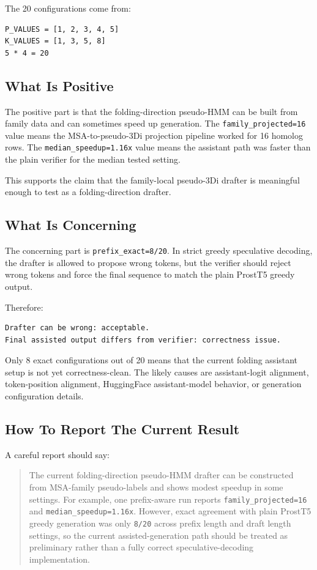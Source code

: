 \documentclass[11pt,a4paper]{article}
\begin{document}
The 20 configurations come from:

\begin{verbatim}
P_VALUES = [1, 2, 3, 4, 5]
K_VALUES = [1, 3, 5, 8]
5 * 4 = 20
\end{verbatim}

\subsection{What Is Positive}

The positive part is that the folding-direction pseudo-HMM can be built from family data and can sometimes speed up generation. The \texttt{family\_projected=16} value means the MSA-to-pseudo-3Di projection pipeline worked for 16 homolog rows. The \texttt{median\_speedup=1.16x} value means the assistant path was faster than the plain verifier for the median tested setting.

This supports the claim that the family-local pseudo-3Di drafter is meaningful enough to test as a folding-direction drafter.

\subsection{What Is Concerning}

The concerning part is \texttt{prefix\_exact=8/20}. In strict greedy speculative decoding, the drafter is allowed to propose wrong tokens, but the verifier should reject wrong tokens and force the final sequence to match the plain ProstT5 greedy output.

Therefore:

\begin{verbatim}
Drafter can be wrong: acceptable.
Final assisted output differs from verifier: correctness issue.
\end{verbatim}

Only 8 exact configurations out of 20 means that the current folding assistant setup is not yet correctness-clean. The likely causes are assistant-logit alignment, token-position alignment, HuggingFace assistant-model behavior, or generation configuration details.

\subsection{How To Report The Current Result}

A careful report should say:

\begin{quote}
The current folding-direction pseudo-HMM drafter can be constructed from MSA-family pseudo-labels and shows modest speedup in some settings. For example, one prefix-aware run reports \texttt{family\_projected=16} and \texttt{median\_speedup=1.16x}. However, exact agreement with plain ProstT5 greedy generation was only \texttt{8/20} across prefix length and draft length settings, so the current assisted-generation path should be treated as preliminary rather than a fully correct speculative-decoding implementation.
\end{quote}
\end{document}
